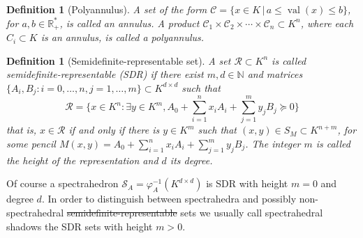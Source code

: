 \documentclass[sigconf]{acmart}
\newcommand{\R}{\mathbb{R}} %
\newcommand{\N}{\mathbb{N}} %
\newtheorem{definition}[theorem]{Definition}
\DeclareMathOperator{\val}{val}
\providecommand{\DIFaddtex}[1]{{\protect\color{blue}\uwave{#1}}} %
\providecommand{\DIFdeltex}[1]{{\protect\color{red}\sout{#1}}}                      %
\providecommand{\DIFaddbegin}{} %
\providecommand{\DIFaddend}{} %
\providecommand{\DIFdelbegin}{} %
\providecommand{\DIFdelend}{} %
\providecommand{\DIFadd}[1]{\texorpdfstring{\DIFaddtex{#1}}{#1}} %
\providecommand{\DIFdel}[1]{\texorpdfstring{\DIFdeltex{#1}}{}} %
\newcommand{\DIFscaledelfig}{0.5}
\newlength{\DIFdelgraphicswidth} %
\newlength{\DIFdelgraphicsheight} %
\newcommand{\DIFaddincludegraphics}[2][]{{\color{blue}\fbox{\DIFOincludegraphics[#1]{#2}}}} %
\newcommand{\DIFdelincludegraphics}[2][]{%
\sbox{\DIFdelgraphicsbox}{\DIFOincludegraphics[#1]{#2}}%
\settoboxwidth{\DIFdelgraphicswidth}{\DIFdelgraphicsbox} %
\settoboxtotalheight{\DIFdelgraphicsheight}{\DIFdelgraphicsbox} %
\scalebox{\DIFscaledelfig}{%
\parbox[b]{\DIFdelgraphicswidth}{\usebox{\DIFdelgraphicsbox}\\[-\baselineskip] \rule{\DIFdelgraphicswidth}{0em}}\llap{\resizebox{\DIFdelgraphicswidth}{\DIFdelgraphicsheight}{%
\setlength{\unitlength}{\DIFdelgraphicswidth}%
\begin{picture}(1,1)%
\thicklines\linethickness{2pt} %
{\color[rgb]{1,0,0}\put(0,0){\framebox(1,1){}}}%
{\color[rgb]{1,0,0}\put(0,0){\line( 1,1){1}}}%
{\color[rgb]{1,0,0}\put(0,1){\line(1,-1){1}}}%
\end{picture}%
}\hspace*{3pt}}} %
} %
\DeclareRobustCommand{\DIFaddbegin}{\DIFOaddbegin \let\includegraphics\DIFaddincludegraphics} %
\DeclareRobustCommand{\DIFaddend}{\DIFOaddend \let\includegraphics\DIFOincludegraphics} %
\DeclareRobustCommand{\DIFdelbegin}{\DIFOdelbegin \let\includegraphics\DIFdelincludegraphics} %
\DeclareRobustCommand{\DIFdelend}{\DIFOaddend \let\includegraphics\DIFOincludegraphics} %
\begin{document}
\begin{definition}[Polyannulus]\label{def_annuli}
  A set of the form $\mathcal{C} = \{x \in K \,|\, a \le \val(x) \le b\}$, for \DIFdelbegin \DIFdel{$a,b \in \R^*_+$}\DIFdelend \DIFaddbegin \DIFadd{$a,b \in \R^*_+ = \{x \in \R : x>0\}$}\DIFaddend ,
  is called an \emph{annulus}. A product $\mathcal{C}_1 \times \mathcal{C}_2 \times \cdots \times \mathcal{C}_n \subset K^n$,
  where each $C_i \subset K$ is an annulus, is called a \emph{polyannulus}.
\end{definition}

\begin{definition}[Semidefinite-representable set]\label{def_semi_def_rep_set}
  A set $\mathcal{R} \subset K^n$ is called
  \emph{semide\-fi\-nite-re\-pre\-sen\-ta\-ble (SDR)} if there exist $m,d \in \N$ and
  matrices $\{A_i,B_j : i = 0, \ldots, n, j = 1, \ldots, m\} \subset K^{d \times d}$ such that
  $$
  \mathcal{R} = \Big\{x \in K^n : \exists y \in K^m, A_0+\sum_{i=1}^n x_iA_i + \sum_{j=1}^m y_jB_j \succeq 0\Big\}
  $$
  that is, $x \in \mathcal{R}$ if and only if there is $y \in K^m$ such that
  $(x,y) \in S_M \subset K^{n+m}$, for some pencil $M(x,y) = A_0+\sum_{i=1}^n x_iA_i + \sum_{j=1}^m y_jB_j$.
  The integer $m$ is called the \emph{height} of the representation and $d$ its \emph{degree}.
\end{definition}

Of course a spectrahedron $\mathcal{S}_A = \varphi_A^{-1}(K^{d \times d})$ is SDR with height $m=0$ and degree
$d$. In order to distinguish between spectrahedra and possibly non-spectrahedral \DIFdelbegin \DIFdel{semidefinite-representable }\DIFdelend \DIFaddbegin \DIFadd{SDR }\DIFaddend sets
we usually call {spectrahedral shadows} the SDR sets with height $m>0$.
\end{document}
